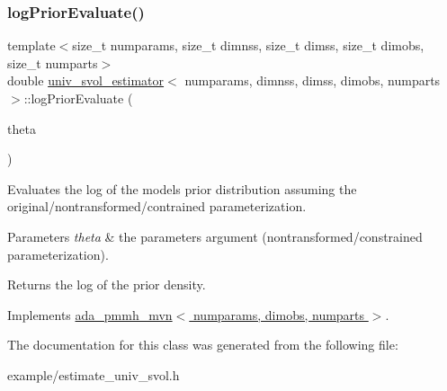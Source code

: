 \mbox{\label{classuniv__svol__estimator_a6ee82e972206fa6ba1c8b4e359a7f6b7}} 
\subsubsection{\texorpdfstring{log\+Prior\+Evaluate()}{logPriorEvaluate()}}
{\footnotesize\ttfamily template$<$size\+\_\+t numparams, size\+\_\+t dimnss, size\+\_\+t dimss, size\+\_\+t dimobs, size\+\_\+t numparts$>$ \\
double \hyperlink{classuniv__svol__estimator}{univ\+\_\+svol\+\_\+estimator}$<$ numparams, dimnss, dimss, dimobs, numparts $>$\+::log\+Prior\+Evaluate (\begin{DoxyParamCaption}\item[{const \hyperlink{classparamPack}{param\+Pack} \&}]{theta }\end{DoxyParamCaption})\hspace{0.3cm}{\ttfamily [virtual]}}



Evaluates the log of the model\textquotesingle{}s prior distribution assuming the original/nontransformed/contrained parameterization. 


\begin{DoxyParams}{Parameters}
{\em theta} & the parameters argument (nontransformed/constrained parameterization). \\
\hline
\end{DoxyParams}
\begin{DoxyReturn}{Returns}
the log of the prior density. 
\end{DoxyReturn}


Implements \hyperlink{classada__pmmh__mvn_aff5af228ed4a7149287493e3ea6a5467}{ada\+\_\+pmmh\+\_\+mvn$<$ numparams, dimobs, numparts $>$}.



The documentation for this class was generated from the following file\+:\begin{DoxyCompactItemize}
\item 
example/estimate\+\_\+univ\+\_\+svol.\+h\end{DoxyCompactItemize}
